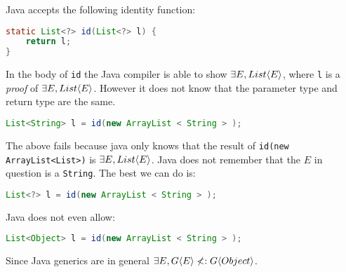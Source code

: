 \documentclass{article}
\begin{document}
\begin{example}
Java accepts the following identity function:
\begin{lstlisting}[escapechar=|, language=Java]
static List<?> id(List<?> l) {
    return l;
}
\end{lstlisting}
In the body of \texttt{id} the Java compiler is able to show $\exists E, List \langle E \rangle$, where \texttt{l} is a \textit{proof} of $\exists E, List \langle E \rangle$.
However it does not know that the parameter type and return type are the same.
\begin{lstlisting}[escapechar=|, language=Java]
List<String> l = id(new ArrayList < String > );
\end{lstlisting}
The above fails because java only knows that the result of \texttt{id(new ArrayList<List>)} is $\exists E, List \langle E \rangle$.
Java does not remember that the $E$ in question is a \texttt{String}.
The best we can do is:
\begin{lstlisting}[escapechar=|, language=Java]
List<?> l = id(new ArrayList < String > );
\end{lstlisting}
Java does not even allow:
\begin{lstlisting}[escapechar=|, language=Java]
List<Object> l = id(new ArrayList < String > );
\end{lstlisting}
Since Java generics are \textit{\invar{}} in general $\exists E, G \langle E \rangle \nless: G \langle Object \rangle$.
\end{example}
\end{document}
